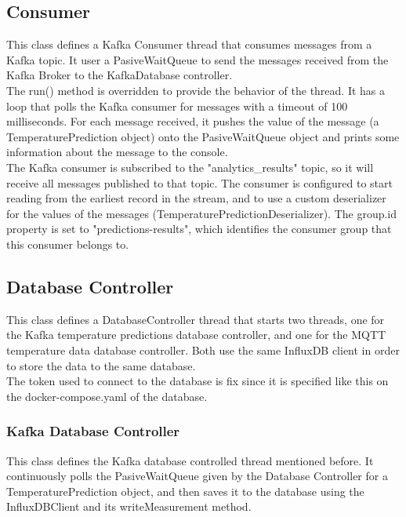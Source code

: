 \documentclass[../informe.tex]{subfiles}
\begin{document}
\subsection{Consumer}
This class defines a Kafka Consumer thread that consumes messages from a Kafka topic. It user a PasiveWaitQueue to send the messages received from the Kafka Broker to the KafkaDatabase controller. \\

The run() method is overridden to provide the behavior of the thread. It has a loop that polls the Kafka consumer for messages with a timeout of 100 milliseconds. For each message received, it pushes the value of the message (a TemperaturePrediction object) onto the PasiveWaitQueue object and prints some information about the message to the console. \\

The Kafka consumer is subscribed to the "analytics\_results" topic, so it will receive all messages published to that topic. The consumer is configured to start reading from the earliest record in the stream, and to use a custom deserializer for the values of the messages (TemperaturePredictionDeserializer). The group.id property is set to "predictions-results", which identifies the consumer group that this consumer belongs to. \\

\subsection{Database Controller}
This class defines a DatabaseController thread that starts two threads, one for the Kafka temperature predictions database controller, and one for the MQTT temperature data database controller. Both use the same InfluxDB client in order to store the data to the same database. \\

The token used to connect to the database is fix since it is specified like this on the docker-compose.yaml of the database. \\

\subsubsection{Kafka Database Controller}
This class defines the Kafka database controlled thread mentioned before. It continuously polls the PasiveWaitQueue given by the Database Controller for a TemperaturePrediction object, and then saves it to the database using the InfluxDBClient and its writeMeasurement method. \\
\end{document}
